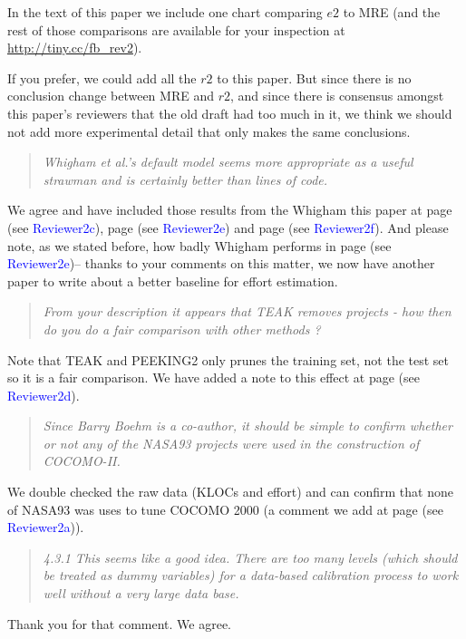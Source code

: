 \documentclass[smallcondesed]{svjour3}
\newcommand{\WHERE}[1]{page \pageref{err:#1} (see \textcolor{blue}{#1})}
\begin{document}
In the text of this paper we   include one chart comparing $e2$ to MRE
(and the rest of those comparisons are available for
your  inspection at \url{http://tiny.cc/fb_rev2}). 


If you prefer,  we could add all the $r2$ to this paper.
But since there is no conclusion change between MRE and $r2$, and since there is consensus amongst this paper's
reviewers that the old draft had too much in it, we think we should not
add  more experimental detail that
only makes the same conclusions.


\begin{quote}{\em Whigham et al.'s default model seems more
  appropriate as a useful strawman and is certainly
  better than lines of code.}\end{quote}

 We agree and 
have included those results from the Whigham this paper at
\WHERE{Reviewer2c}, \WHERE{Reviewer2e} and \WHERE{Reviewer2f}. And please note, as we stated
before, how badly
Whigham performs in \WHERE{Reviewer2e}-- thanks to your comments on this matter, we now have
another paper to write about a better baseline for effort estimation.


\begin{quote}{\em From your description it appears that TEAK
  removes projects - how then do you do a fair
  comparison with other methods ? }\end{quote}

\noindent Note that TEAK and PEEKING2 only prunes the training set, not the test set so it is a fair comparison.
We have added a note to this effect at \WHERE{Reviewer2d}.

\begin{quote}{\em Since Barry Boehm is a co-author, it should be simple to confirm whether or not any of the NASA93 projects were used in the construction of COCOMO-II.}\end{quote}

\noindent We double checked the raw data (KLOCs and effort)
and can confirm that none of NASA93 was uses
to tune COCOMO 2000 (a comment we add at 
\WHERE{Reviewer2a}).


\begin{quote}{\em  4.3.1 This seems like a good idea. There are too many levels (which should be treated as dummy variables) for a data-based calibration process to work well without a very large data base.}\end{quote}

\noindent
Thank you for that comment. We agree.
\end{document}
